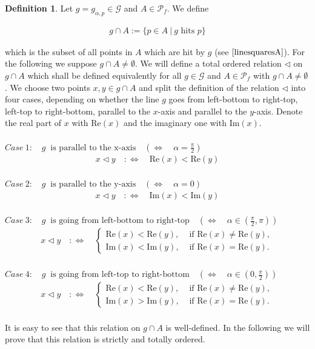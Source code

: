 \documentclass[12pt,a4paper]{scrartcl}
\numberwithin{equation}{subsection}
\newcommand{\1}{\mathbbm{1}}
\newcommand{\G}{\mathcal{G}}
\newcommand{\mP}{\mathcal{P}}
\newcommand{\re}{\text{Re}}
\newcommand{\im}{\text{Im}}
\numberwithin{equation}{section}
\theoremstyle{definition}
\newtheorem{definition}{Definition}[subsection]
\begin{document}
\begin{definition} \label{ghitA}
	Let $g=g_{\alpha,p}\in \G$ and $A\in \mP_f$. We define 
	
	\begin{align*}
		g\cap A := \{ p\in A\ |\ g \text{ hits } p\}
	\end{align*}
	
	which is the subset of all points in $A$ which are hit by $g$ (see $\autoref{linesquaresA}$). For the following we suppose $g\cap A \neq \emptyset$. We will define a total ordered relation $\triangleleft$ on $g\cap A$ which shall be defined equivalently for all $g\in \G$ and $A\in\mP_f$ with $g\cap A \neq\emptyset$. We choose two points $x,y\in g\cap A$ and split the definition of the relation $\triangleleft$ into four cases, depending on whether the line $g$ goes from left-bottom to right-top, left-top to right-bottom, parallel to the $x$-axis and parallel to the $y$-axis. Denote the real part of $x$ with $\re(x)$ and the imaginary one with $\im(x)$. \\
	\\
	$\mathit{Case}\ 1:\quad g\ \text{ is parallel to the x-axis}\quad (\Leftrightarrow\quad \alpha = \frac{\pi}{2})$
	\begin{align*}
	x \triangleleft y \quad :\Leftrightarrow \quad \re(x) < \re(y)
	\end{align*}\\
	$\mathit{Case}\ 2:\quad g\ \text{ is parallel to the y-axis}\quad (\Leftrightarrow\quad \alpha = 0)$
	\begin{align*}
	x \triangleleft y \quad :\Leftrightarrow \quad \im(x) < \im(y)
	\end{align*}\\
	$\mathit{Case}\ 3:\quad g\ \text{ is going from left-bottom to right-top}\quad (\Leftrightarrow\quad \alpha\in (\frac{\pi}{2},\pi))$
	\begin{align*}
	x \triangleleft y \quad :\Leftrightarrow \quad
		\begin{cases}
			\re(x) < \re(y), & \text{ if } \re(x) \neq \re(y), \\
			\im(x) < \im(y), & \text{ if } \re(x) = \re(y).
		\end{cases}
	\end{align*}\\
	$\mathit{Case}\ 4:\quad g\ \text{ is going from left-top to right-bottom}\quad (\Leftrightarrow\quad \alpha\in (0,\frac{\pi}{2}))$
	\begin{align*}
	x \triangleleft y \quad :\Leftrightarrow \quad
	\begin{cases}
	\re(x) < \re(y), & \text{ if } \re(x) \neq \re(y), \\
	\im(x) > \im(y), & \text{ if } \re(x) = \re(y).
	\end{cases}
	\end{align*}\\
	It is easy to see that this relation on $g\cap A$ is well-defined. In the following we will prove that this relation is strictly and totally ordered. 
\end{definition}
\end{document}
